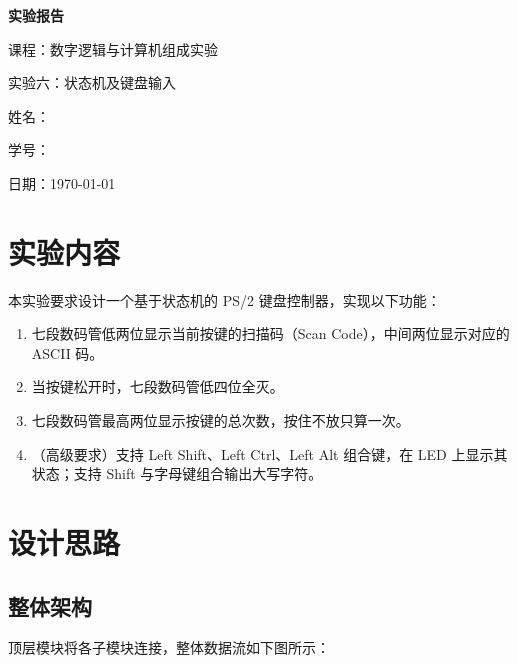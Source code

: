 \documentclass[12pt, a4paper]{ctexart}
\begin{document}
\begin{titlepage}
    \centering
    \vspace*{5cm}
    {\Huge\bfseries 实验报告\par}
    \vspace{2cm}
    {\Large 课程：数字逻辑与计算机组成实验\par}
    \vspace{1cm}
    {\Large 实验六：状态机及键盘输入\par}
    \vspace{4cm}
    {\large 姓名：\underline{}\par}
    \vspace{1cm}
    {\large 学号：\underline{}\par}
    \vspace{1cm}
    {\large 日期：\today\par}
\end{titlepage}

\tableofcontents
\newpage

\section{实验内容}

本实验要求设计一个基于状态机的 PS/2 键盘控制器，实现以下功能：

\begin{enumerate}
    \item 七段数码管低两位显示当前按键的扫描码（Scan Code），中间两位显示对应的 ASCII 码。
    \item 当按键松开时，七段数码管低四位全灭。
    \item 七段数码管最高两位显示按键的总次数，按住不放只算一次。
    \item （高级要求）支持 Left Shift、Left Ctrl、Left Alt 组合键，在 LED 上显示其状态；支持 Shift 与字母键组合输出大写字符。
\end{enumerate}

\section{设计思路}

\subsection{整体架构}

顶层模块将各子模块连接，整体数据流如下图所示：
\end{document}
